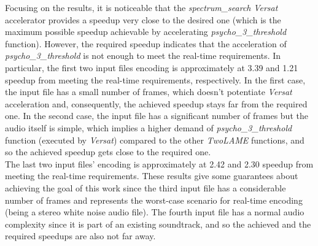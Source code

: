 Focusing on the results, it is noticeable that the \textit{spectrum\_search} \textit{Versat} accelerator provides a speedup very close to the desired one (which is the maximum possible speedup achievable by accelerating \textit{psycho\_3\_threshold} function).
However, the required speedup indicates that the acceleration of \textit{psycho\_3\_threshold} is not enough to meet the real-time requirements. 
In particular, the first two input files encoding is approximately at 3.39 and 1.21 speedup from meeting the real-time requirements, respectively. In the first case, the input file has a small number of frames, which doesn't potentiate \textit{Versat} acceleration and, consequently, the achieved speedup stays far from the required one.
In the second case, the input file has a significant number of frames but the audio itself is simple, which implies a higher demand of \textit{psycho\_3\_threshold} function (executed by \textit{Versat}) compared to the other \textit{TwoLAME} functions, and so the achieved speedup gets close to the required one. \\
The last two input files' encoding is approximately at 2.42 and 2.30 speedup from meeting the real-time requirements. These results give some guarantees about achieving the goal of this work since the third input file has a considerable number of frames and represents the worst-case scenario for real-time encoding (being a stereo white noise audio file). The fourth input file has a normal audio complexity since it is part of an existing soundtrack, and so the achieved and the required speedups are also not far away.

